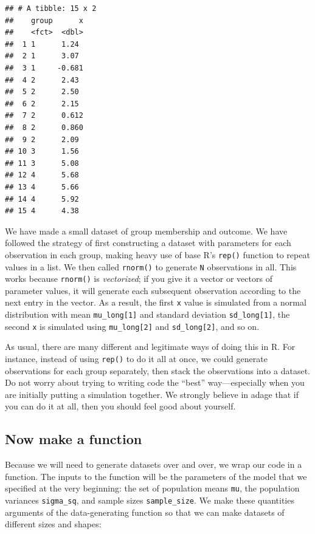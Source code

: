 \documentclass[
]{book}
\begin{document}
\begin{verbatim}
## # A tibble: 15 x 2
##    group      x
##    <fct>  <dbl>
##  1 1      1.24 
##  2 1      3.07 
##  3 1     -0.681
##  4 2      2.43 
##  5 2      2.50 
##  6 2      2.15 
##  7 2      0.612
##  8 2      0.860
##  9 2      2.09 
## 10 3      1.56 
## 11 3      5.08 
## 12 4      5.68 
## 13 4      5.66 
## 14 4      5.92 
## 15 4      4.38
\end{verbatim}

We have made a small dataset of group membership and outcome.
We have followed the strategy of first constructing a dataset with parameters for each observation in each group, making heavy use of base R's \texttt{rep()} function to repeat values in a list.
We then called \texttt{rnorm()} to generate \texttt{N} observations in all.
This works because \texttt{rnorm()} is \emph{vectorized}; if you give it a vector or vectors of parameter values, it will generate each subsequent observation according to the next entry in the vector. As a result, the first \texttt{x} value is simulated from a normal distribution with mean \texttt{mu\_long{[}1{]}} and standard deviation \texttt{sd\_long{[}1{]}}, the second \texttt{x} is simulated using \texttt{mu\_long{[}2{]}} and \texttt{sd\_long{[}2{]}}, and so on.

As usual, there are many different and legitimate ways of doing this in R.
For instance, instead of using \texttt{rep()} to do it all at once, we could generate observations for each group separately, then stack the observations into a dataset.
Do not worry about trying to writing code the ``best'' way---especially when you are initially putting a simulation together.
We strongly believe in adage that if you can do it at all, then you should feel good about yourself.

\subsection{Now make a function}\label{now-make-a-function}

Because we will need to generate datasets over and over, we wrap our code in a function.
The inputs to the function will be the parameters of the model that we specified at the very beginning: the set of population means \texttt{mu}, the population variances \texttt{sigma\_sq}, and sample sizes \texttt{sample\_size}. We make these quantities arguments of the data-generating function so that we can make datasets of different sizes and shapes:
\end{document}
